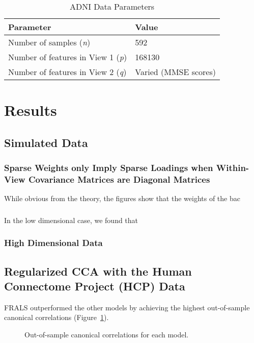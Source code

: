 \begin{table}[h]
\centering
\caption{ADNI Data Parameters}
\begin{tabular}{| l | l |}
\hline
\textbf{Parameter} & \textbf{Value} \\
\hline
Number of samples (\textit{n}) & 592 \\
Number of features in View 1 (\textit{p}) & 168130 \\
Number of features in View 2 (\textit{q}) & Varied (MMSE scores) \\
\hline
\end{tabular}
\label{table:adni-parameters}
\end{table}

\section{Results}

\subsection{Simulated Data}

\subsubsection{Sparse Weights only Imply Sparse Loadings when Within-View Covariance Matrices are Diagonal Matrices}

While obvious from the theory, the figures show that the weights of the bac

\subsubsection{}

In the low dimensional case, we found that

\subsubsection{High Dimensional Data}


\subsection{Regularized CCA with the Human Connectome Project (HCP) Data}

FRALS outperformed the other models by achieving the highest out-of-sample canonical correlations (Figure~\ref{fig:performance}).

\begin{figure}[h]
\centering

\caption{Out-of-sample canonical correlations for each model.}
\label{fig:performance}
\end{figure}

